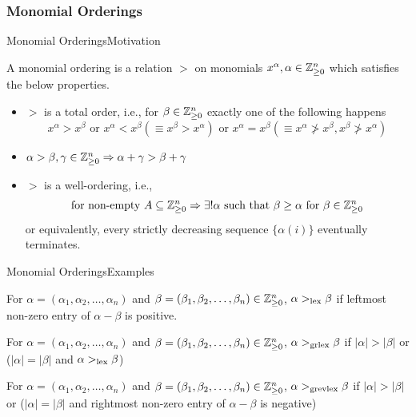 \documentclass[aspectratio=169, handout, 10pt, hyperref=colorlinks]{beamer}
\begin{document}
\subsubsection{Monomial Orderings}
\begin{frame}{Monomial Orderings}{Motivation}
\begin{defn}
    A monomial ordering is a relation $>$ on monomials $x^\alpha, \alpha \in \mathbb{Z}^n_{\geq0}$ which satisfies the below properties.
    \begin{itemize}
        \item $>$ is a total order, i.e., for $\beta\in \mathbb{Z}^n_{\geq0}$ exactly one of the following happens
        \begin{equation}
            x^\alpha > x^\beta \text{ or }  x^\alpha < x^\beta (\equiv x^\beta > x^\alpha) \text{ or } x^\alpha = x^\beta (\equiv x^\alpha\ngtr x^\beta, x^\beta\ngtr x^\alpha)
        \end{equation}
        \item $\alpha>\beta, \gamma\in \mathbb{Z}^n_{\geq0}\Rightarrow \alpha+\gamma>\beta+\gamma$
        \item $>$ is a well-ordering, i.e.,
        \begin{equation}
            \text{for non-empty } A\subseteq\mathbb{Z}^n_{\geq0} \Rightarrow \exists!\alpha \text{ such that } \beta\geq\alpha \text{ for } \beta\in \mathbb{Z}^n_{\geq0}
        \end{equation}
        or equivalently, every strictly decreasing sequence $\{\alpha(i)\}$ eventually terminates.
    \end{itemize}
\end{defn}
\end{frame}
\begin{frame}{Monomial Orderings}{Examples}
\begin{defn}
    For $\alpha=(\alpha_1, \alpha_2, \ldots, \alpha_n)$ and $\beta=(\beta_1, \beta_2, \ldots, \beta_n) \in \mathbb{Z}^n_{\geq0}$, $\alpha>_{\text{lex}}\beta$ if leftmost non-zero entry of $\alpha-\beta$ is positive.\\
\end{defn}
\begin{defn}
    For $\alpha=(\alpha_1, \alpha_2, \ldots, \alpha_n)$ and $\beta=(\beta_1, \beta_2, \ldots, \beta_n) \in \mathbb{Z}^n_{\geq0}$, $\alpha>_{\text{grlex}}\beta$ if $|\alpha|>|\beta|$ or ($|\alpha|=|\beta|$ and $\alpha>_{\text{lex}}\beta$)
\end{defn}
\begin{defn}
    For $\alpha=(\alpha_1, \alpha_2, \ldots, \alpha_n)$ and $\beta=(\beta_1, \beta_2, \ldots, \beta_n) \in \mathbb{Z}^n_{\geq0}$, $\alpha>_{\text{grevlex}}\beta$ if $|\alpha|>|\beta|$ or ($|\alpha|=|\beta|$ and rightmost non-zero entry of $\alpha-\beta$ is negative)
\end{defn}
\end{frame}
\end{document}
